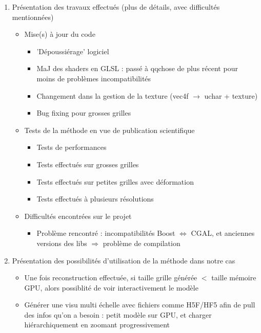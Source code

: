 {{\begin{enumerate}
\begin{itemize}
				\item (Rapide) Raymarching/Bresenham pour trouver voxel, et estimer normale et couleur
				\item Note : mentionner le fait que du coup, la complexité revient à la taille du framebuffer, non de la grille
				\item Effet de bord : on peut donc charger des grilles rentrant sur GPU, les déformer afin d'avoir une grille techniquement + grande que espace mémoire GPU
			\end{itemize}
			\item Présentation des travaux effectués (plus de détails, avec difficultés mentionnées)~\begin{itemize}
				\item Mise(s) à jour du code~\begin{itemize}
					\item 'Dépoussiérage' logiciel
					\item MaJ des shaders en GLSL : passé à qqchose de plus récent pour moins de problèmes incompatibilités
					\item Changement dans la gestion de la texture (vec4f $\rightarrow$ uchar + texture)
					\item Bug fixing pour grosses grilles
				\end{itemize}
				\item Tests de la méthode en vue de publication scientifique~\begin{itemize}
					\item Tests de performances
					\item Tests effectués sur grosses grilles
					\item Tests effectués sur petites grilles avec déformation
					\item Tests effectués à plusieurs résolutions
				\end{itemize}
				\item Difficultés encontrées sur le projet~\begin{itemize}
					\item Problème rencontré : incompatibilités Boost $\Leftrightarrow$ CGAL, et anciennes versions des libs $\Rightarrow$ problème de compilation
				\end{itemize}
			\end{itemize}
			\item Présentation des possibilités d'utilisation de la méthode dans notre cas~\begin{itemize}
				\item Une fois reconstruction effectuée, si taille grille générée $<$ taille mémoire GPU, alors possiblité de voir interactivement le modèle
				\item Générer une visu multi échelle avec fichiers comme H5F/HF5 afin de pull des infos qu'on a besoin : petit modèle sur GPU, et charger hiérarchiquement en zoomant progressivement
			\end{itemize}
		\end{enumerate}
	}

}
